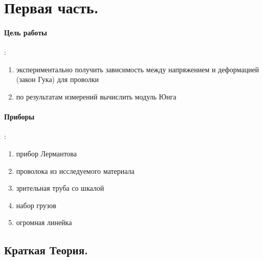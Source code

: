 \documentclass[a4paper,12pt]{article}
\numberwithin{equation}{section}
\begin{document}

\tableofcontents

\section{Первая часть.}

\paragraph{Цель работы}:
\begin{enumerate}
  \item экспериментально получить зависимость между напряжением и деформацией (закон Гука) для проволки
  \item по результатам измерений вычислить модуль Юнга
\end{enumerate}

\paragraph{Приборы}:
\begin{enumerate}
  \item прибор Лермантова
  \item проволока из исследуемого материала
  \item зрительная труба со шкалой
  \item набор грузов
  \item огромная линейка
\end{enumerate}

\subsection{Краткая Теория.}
\end{document}
